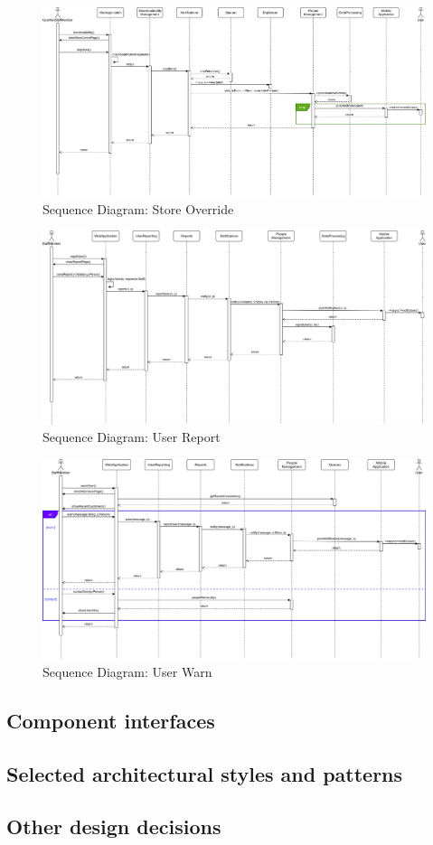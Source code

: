 \begin{figure}[H]
	\includegraphics[width=\linewidth]{../Diagrams/Sequence/sequence_store_override.png}
	\caption{Sequence Diagram: Store Override}
	\label{fig:sStoreOver}
\end{figure}

\begin{figure}[H]
	\includegraphics[width=\linewidth]{../Diagrams/Sequence/sequence_user_report.png}
	\caption{Sequence Diagram: User Report}
	\label{fig:sUserRep}
\end{figure}

\begin{figure}[H]
	\includegraphics[width=\linewidth]{../Diagrams/Sequence/sequence_user_warn.png}
	\caption{Sequence Diagram: User Warn}
	\label{fig:sUserWarn}
\end{figure}

\subsection{Component interfaces}
\subsection{Selected architectural styles and patterns}
\subsection{Other design decisions}
